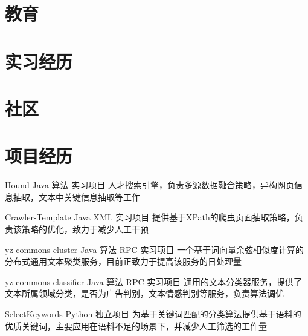\documentclass[11pt,a4paper]{moderncv}
\title{}               %
\begin{document}
\maketitle

\section{教育}

\section{实习经历}

\section{社区}

\section{项目经历}
\renewcommand{\baselinestretch}{1.2}

{Hound}
{Java 算法}
{实习项目}{}
{人才搜索引擎，负责多源数据融合策略，异构网页信息抽取，文本中关键信息抽取等工作}

\vspace*{0.2\baselineskip}
{Crawler-Template}
{Java XML}
{实习项目}{}
{提供基于XPath的爬虫页面抽取策略，负责该策略的优化，致力于减少人工干预}

\vspace*{0.2\baselineskip}
{yz-commons-cluster}
{Java 算法 RPC}
{实习项目}{}
{一个基于词向量余弦相似度计算的分布式通用文本聚类服务，目前正致力于提高该服务的日处理量}

\vspace*{0.2\baselineskip}
{yz-commons-classifier}
{Java 算法 RPC}
{实习项目}{}
{通用的文本分类器服务，提供了文本所属领域分类，是否为广告判别，文本情感判别等服务，负责算法调优}

\vspace*{0.2\baselineskip}
{SelectKeywords}
{Python}
{独立项目}{}
{为基于关键词匹配的分类算法提供基于语料的优质关键词，主要应用在语料不足的场景下，并减少人工筛选的工作量}
\end{document}
